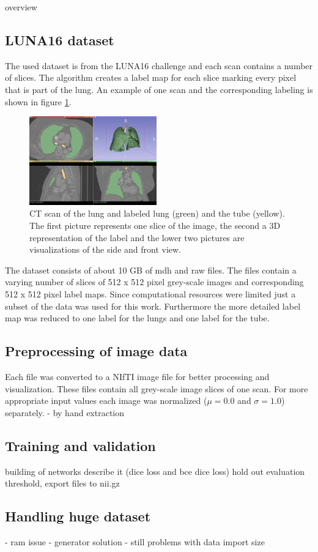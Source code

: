 
overview

\subsection{LUNA16 dataset}

The used dataset is from the LUNA16 challenge and each scan contains a number of slices. The algorithm creates a label map for each slice marking every pixel that is part of the lung. An example of one scan and the corresponding labeling is shown in figure \ref{scan_picture}.

\begin{figure}[h!]
	\includegraphics[width=0.49\textwidth, angle=0]{files/Fulllayoutprediction.png}
	\caption{CT scan of the lung and labeled lung (green) and the tube (yellow). The first picture represents one slice of the image, the second a 3D representation of the label and the lower two pictures are visualizations of the side and front view.}
	\label{scan_picture}
\end{figure}

The dataset consists of about 10 GB of mdh and raw files. The files contain a varying number of slices of 512 x 512 pixel grey-scale images and corresponding 512 x 512 pixel label maps. Since computational resources were limited just a subset of the data was used for this work. Furthermore the more detailed label map was reduced to one label for the lungs and one label for the tube.

\subsection{Preprocessing of image data}
Each file was converted to a NIfTI image file for better processing and visualization. These files contain all grey-scale image slices of one scan. For more appropriate input values each image was normalized ($\mu = 0.0$ and $\sigma = 1.0$) separately.
- by hand extraction

\subsection{Training and validation}

building of networks
describe it (dice loss and bce dice loss)
hold out evaluation
threshold, export files to nii.gz

\subsection{Handling huge dataset}
- ram issue
- generator solution
- still problems with data import size



